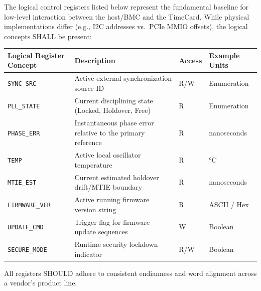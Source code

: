 The logical control registers listed below represent the fundamental
baseline for low-level interaction between the host/BMC and the
TimeCard. While physical implementations differ (e.g., I2C addresses
vs.~PCIe MMIO offsets), the logical concepts SHALL be present:

{\def\LTcaptype{none} %
\begin{longtable}[]{@{}
  >{\raggedright\arraybackslash}p{}
  >{\raggedright\arraybackslash}p{}
  >{\raggedright\arraybackslash}p{}
  >{\raggedright\arraybackslash}p{}@{}}
\toprule\noalign{}
\begin{minipage}[b]{\linewidth}\raggedright
Logical Register Concept
\end{minipage} & \begin{minipage}[b]{\linewidth}\raggedright
Description
\end{minipage} & \begin{minipage}[b]{\linewidth}\raggedright
Access
\end{minipage} & \begin{minipage}[b]{\linewidth}\raggedright
Example Units
\end{minipage} \\
\midrule\noalign{}
\endhead
\bottomrule\noalign{}
\endlastfoot
\texttt{SYNC\_SRC} & Active external synchronization source ID & R/W &
Enumeration \\
\texttt{PLL\_STATE} & Current disciplining state (Locked, Holdover,
Free) & R & Enumeration \\
\texttt{PHASE\_ERR} & Instantaneous phase error relative to the primary
reference & R & nanoseconds \\
\texttt{TEMP} & Active local oscillator temperature & R & °C \\
\texttt{MTIE\_EST} & Current estimated holdover drift/MTIE boundary & R
& nanoseconds \\
\texttt{FIRMWARE\_VER} & Active running firmware version string & R &
ASCII / Hex \\
\texttt{UPDATE\_CMD} & Trigger flag for firmware update sequences & W &
Boolean \\
\texttt{SECURE\_MODE} & Runtime security lockdown indicator & R/W &
Boolean \\
\end{longtable}
}

All registers SHOULD adhere to consistent endianness and word alignment
across a vendor's product line.

